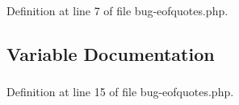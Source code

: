 \-Definition at line 7 of file bug-\/eofquotes.\-php.


\begin{DoxyCode}
{
}
\end{DoxyCode}


\subsection{\-Variable \-Documentation}
\hypertarget{bug-eofquotes_8php_ac4fd59c9ee95bff469a7cd55e16f0449}{
\subsubsection[{echo}]{}}\label{bug-eofquotes_8php_ac4fd59c9ee95bff469a7cd55e16f0449}


\-Definition at line 15 of file bug-\/eofquotes.\-php.


